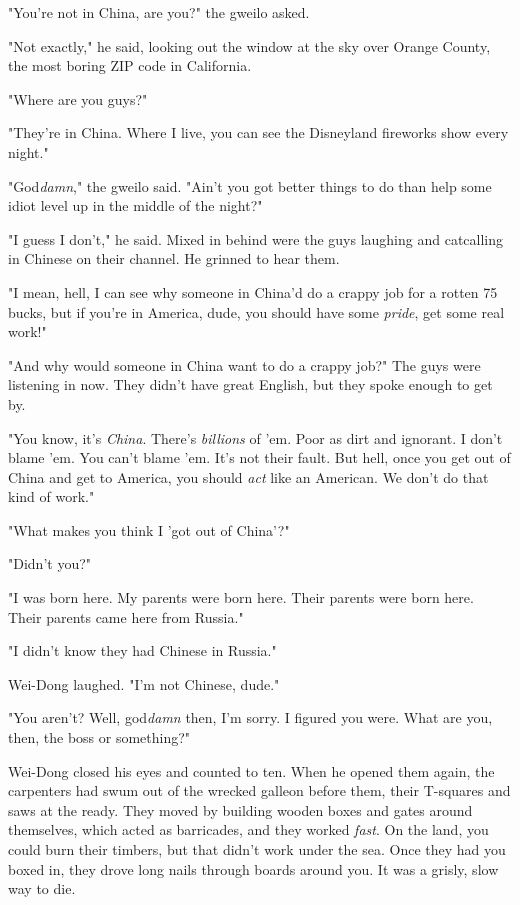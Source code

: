 "You're not in China, are you?" the gweilo asked.

"Not exactly," he said, looking out the window at the sky over
Orange County, the most boring ZIP code in California.

"Where are you guys?"

"They're in China. Where I live, you can see the Disneyland
fireworks show every night."

"God\emph{damn}," the gweilo said. "Ain't you got better things to
do than help some idiot level up in the middle of the night?"

"I guess I don't," he said. Mixed in behind were the guys laughing
and catcalling in Chinese on their channel. He grinned to hear
them.

"I mean, hell, I can see why someone in China'd do a crappy job for
a rotten 75 bucks, but if you're in America, dude, you should have
some \emph{pride}, get some real work!"

"And why would someone in China want to do a crappy job?" The guys
were listening in now. They didn't have great English, but they
spoke enough to get by.

"You know, it's \emph{China}. There's \emph{billions} of 'em. Poor
as dirt and ignorant. I don't blame 'em. You can't blame 'em. It's
not their fault. But hell, once you get out of China and get to
America, you should \emph{act} like an American. We don't do that
kind of work."

"What makes you think I 'got out of China'?"

"Didn't you?"

"I was born here. My parents were born here. Their parents were
born here. Their parents came here from Russia."

"I didn't know they had Chinese in Russia."

Wei-Dong laughed. "I'm not Chinese, dude."

"You aren't? Well, god\emph{damn} then, I'm sorry. I figured you
were. What are you, then, the boss or something?"

Wei-Dong closed his eyes and counted to ten. When he opened them
again, the carpenters had swum out of the wrecked galleon before
them, their T-squares and saws at the ready. They moved by building
wooden boxes and gates around themselves, which acted as
barricades, and they worked \emph{fast}. On the land, you could
burn their timbers, but that didn't work under the sea. Once they
had you boxed in, they drove long nails through boards around you.
It was a grisly, slow way to die.

